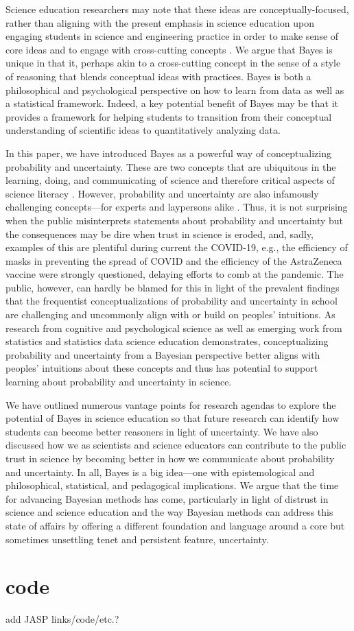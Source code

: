 \documentclass[man]{apa7}
\begin{document}
Science education researchers may note that these ideas are conceptually-focused, rather than aligning with the present emphasis in science education upon engaging students in science and engineering practice in order to make sense of core ideas and to engage with cross-cutting concepts \parencite{nrc12}. We argue that Bayes is unique in that it, perhaps akin to a cross-cutting concept in the sense of a style of reasoning \parencite{so12, ork18} that blends conceptual ideas with practices. Bayes is both a philosophical and psychological perspective on how to learn from data as well as a statistical framework. Indeed, a key potential benefit of Bayes may be that it provides a framework for helping students to transition from their conceptual understanding of scientific ideas to quantitatively analyzing data.

In this paper, we have introduced Bayes as a powerful way of conceptualizing probability and uncertainty. These are two concepts that are ubiquitous in the learning, doing, and communicating of science and therefore critical aspects of science literacy \parencite{}. However, probability and uncertainty are also infamously challenging concepts—for experts and laypersons alike \parencite{gkv04, s07, tk74}. Thus, it is not surprising when the public misinterprets statements about probability and uncertainty but the consequences may be dire when trust in science is eroded, and, sadly, examples of this are plentiful during current the COVID-19, e.g., the efficiency of masks in preventing the spread of COVID and the efficiency of the AstraZeneca vaccine were strongly questioned, delaying efforts to comb at the pandemic. The public, however, can hardly be blamed for this in light of the prevalent findings that the frequentist conceptualizations of probability and uncertainty in school are challenging and uncommonly align with or build on peoples’ intuitions. As research from cognitive and psychological science as well as emerging work from statistics and statistics data science education demonstrates, conceptualizing probability and uncertainty from a Bayesian perspective better aligns with peoples’ intuitions \parencite{kl18, so12} about these concepts and thus has potential to support learning about probability and uncertainty in science. 

We have outlined numerous vantage points for research agendas to explore the potential of Bayes in science education so that future research can identify how students can become better reasoners in light of uncertainty. We have also discussed how we as scientists and science educators can contribute to the public trust in science by becoming better in how we communicate about probability and uncertainty. In all, Bayes is a big idea—one with epistemological and philosophical, statistical, and pedagogical implications. We argue that the time for advancing Bayesian methods has come, particularly in light of distrust in science and science education and the way Bayesian methods can address this state of affairs by offering a different foundation and language around a core but sometimes unsettling tenet and persistent feature, uncertainty. 

\printbibliography

\appendix

\section{code}
add JASP links/code/etc.?
\end{document}
